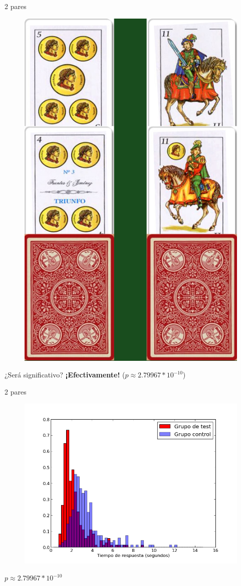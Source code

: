 \documentclass{beamer}
\begin{document}
\begin{frame}{2 pares}
  \begin{figure}
  	\includegraphics[width=0.4\linewidth]{examples_img/manos_2.png}
  \end{figure}
  \begin{center}
  ¿Será significativo?
  \pause
  \textbf{¡Efectivamente!} ($p \approx 2.79967*10^{-10}$)
  \end{center}
\end{frame}

\begin{frame}{2 pares}
  \begin{figure}
  	\includegraphics[width=0.8\linewidth]{graficos/2vs3.png}
  \end{figure}
  
  \begin{center}$p \approx 2.79967*10^{-10}$
  \end{center}
\end{frame}
\end{document}

